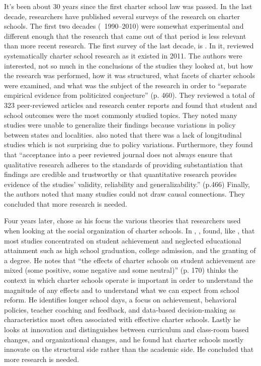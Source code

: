 It's been about 30 years since the first charter school law was passed. In the last decade, researchers have published several surveys of the research on charter schools. The first two decades (~1990–2010) were somewhat experimental and different enough that the research that came out of that period is less relevant than more recent research. The first survey of the last decade, is .  In it, \textcite{Smith.etal2011} reviewed systematically charter school research as it existed in 2011. The authors were interested, not so much in the conclusions of the studies they looked at, but how the research was performed, how it was structured, what facets of charter schools were examined, and what was the subject of the research in order to ``separate empirical evidence from politicized conjecture'' (p. 460). They reviewed a total of 323 peer-reviewed articles and research center reports and found that student and school outcomes were the most commonly studied topics. They noted many studies were unable to generalize their findings because variations in policy between states and localities. \citeauthor{Smith.etal2011} also noted that there was a lack of longitudinal studies which is not surprising due to policy variations. Furthermore, they found that ``acceptance into a peer reviewed journal does not always ensure that qualitative research adheres to the standards of providing substantiation that findings are credible and trustworthy or that quantitative research provides evidence of the studies' validity, reliability and generalizability.'' (p.466) Finally, the authors noted that many studies could not draw causal connections. They concluded that more research is needed.

Four years later, \textcite{Berends2015} chose as his focus the various theories that researchers used when looking at the social organization of charter schools. In , \textcite{Berends2015}, found, like \citeauthor{Smith.etal2011}, that most studies concentrated on student achievement and neglected educational attainment such as high school graduation, college admission, and the granting of a degree. He notes that ``the effects of charter schools on student achievement are mixed (some positive, some negative and some neutral)'' (p. 170) \citeauthor{Berends2015} thinks the context in which charter schools operate is important in order to understand the magnitude of any effects and to understand what we can expect from school reform. He identifies longer school days, a focus on achievement, behavioral policies, teacher coaching and feedback, and data-based decision-making as characteristics most often associated with effective charter schools. Lastly he looks at innovation and distinguishes between curriculum and class-room based changes, and organizational changes, and he found hat charter schools mostly innovate on the structural side rather than the academic side. He concluded that more research is needed.

